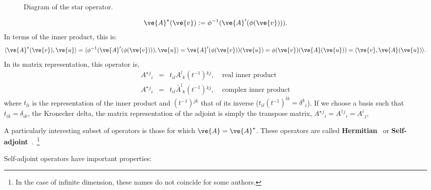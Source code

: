 {%



\espa 


\begin{figure}[htbp]
  \begin{center}
    \caption{Diagram of the star operator.}
    \label{fig:2_3}
  \end{center}
\end{figure}

\begin{equation}
  \label{eq:A_adjunto}
  \ve{A}^{\star}(\ve{v}) := \phi^{-1}(\ve{A}'(\phi(\ve{v}))).
\end{equation}
%
In terms of the inner product, this is:
\begin{equation}
  \label{eq:A_adjunto_2}
  \langle \ve{A}^{\star}(\ve{v}),\ve{u} \rangle = \langle \phi^{-1}(\ve{A}'(\phi(\ve{v}))),\ve{u} \rangle
                                               = \ve{A}'(\phi(\ve{v}))(\ve{u}) 
                                               = \phi(\ve{v})(\ve{A}(\ve{u}))
                                               = \langle \ve{v},\ve{A}(\ve{u}) \rangle.
\end{equation}
%
In its matrix representation, this operator is, 
\begin{eqnarray}
A^{\star}{}^j{}_i &=& t_{il} A^l{}_k (t^{-1}){}^{kj} , \;\;\;\; \mbox{real inner product} \\
A^{\star}{}^j{}_i &=& t_{il} \bar{A}^l{}_k (t^{-1}){}^{kj} , \;\;\;\; \mbox{complex inner product} 
\end{eqnarray}
%
where $t_{li}$ is the representation of the inner product and $(t^{-1}){}^{jk}$ that of its inverse 
($t_{il} (t^{-1})^{lk} = \delta^k{}_i$). 
If we choose a basis such that $t_{ik} = \delta_{ik}$, the Kronecker delta, the matrix representation of the adjoint is simply the transpose matrix, $A^{\star}{}^j{}_i = A^{\dagger}{}^j{}_i = A^i{}_j$, 

A particularly interesting subset of operators is those for which 
$\ve{A} = \ve{A}^{\star}$. These operators are called 
\textbf{Hermitian}~ or 
\textbf{Self-adjoint}~.~\footnote{
In the case of infinite dimension, these names do not coincide for
some authors.}

Self-adjoint operators have important properties:

}
